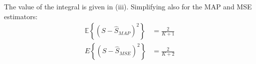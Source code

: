 \begin{solution}
\begin{enumerate}[a)]
%        
        
    
    The value of the integral is given in (iii). Simplifying also for the MAP and MSE estimators:
\begin{align}
\mathbb{E}\left\{ (S-\hat{S}_{MAP})^2\right\} & = \displaystyle\frac{2}{K+1}  \nonumber \\
{E}\left\{(S-\hat{S}_{MSE})^2\right\} & = \displaystyle\frac{2}{K+2}  \nonumber 
\end{align}

\end{enumerate}
\end{solution}





